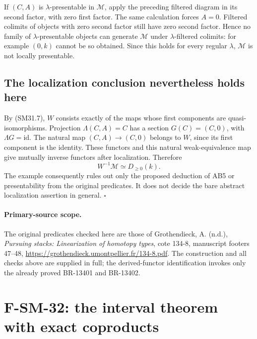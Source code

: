 \documentclass[11pt,a4paper]{article}
\theoremstyle{definition}\newtheorem{definition}[theorem]{Definition}
\theoremstyle{remark}\newtheorem{remark}[theorem]{Remark}
\begin{document}
If \((C,A)\) is \(\lambda\)-presentable in \(\mathcal M\),
apply the preceding filtered diagram in its second factor,
with zero first factor.  The same calculation forces \(A=0\).
Filtered colimits of objects with zero second factor still
have zero second factor.  Hence no family of
\(\lambda\)-presentable objects can generate \(\mathcal M\)
under \(\lambda\)-filtered colimits: for example \((0,k)\)
cannot be so obtained.  Since this holds for every regular
\(\lambda\), \(\mathcal M\) is not locally presentable.

\subsection{The localization conclusion nevertheless holds here}
By (SM31.7), \(W\) consists exactly of the maps whose first
components are quasi-isomorphisms.  Projection
\(\Lambda(C,A)=C\) has a section \(G(C)=(C,0)\), with
\(\Lambda G=\mathrm{id}\).  The natural map
\((C,A)\to(C,0)\) belongs to \(W\), since its first component
is the identity.  These functors and this natural weak-equivalence
map give mutually inverse functors after localization.  Therefore
\[
                W^{-1}\mathcal M\simeq D_{\ge0}(k).
\]
The example consequently rules out only the proposed deduction
of AB5 or presentability from the original predicates.  It does
not decide the bare abstract localization assertion in general.
\(\square\)

\paragraph{Primary-source scope.}
The original predicates checked here are those of
Grothendieck, A. (n.d.), \emph{Pursuing stacks: Linearization
of homotopy types}, cote 134-8, manuscript footers 47--48,
\url{https://grothendieck.umontpellier.fr/134-8.pdf}.
The construction and all checks above are supplied in full;
the derived-functor identification invokes only the already
proved BR-13401 and BR-13402.


\section{F-SM-32: the interval theorem with exact coproducts}
\end{document}
